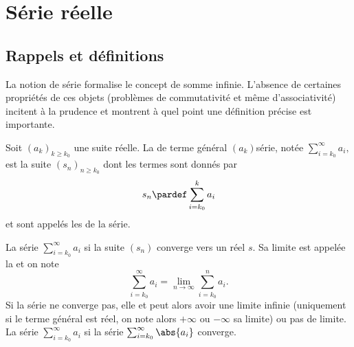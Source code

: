 
\section{Série réelle}
\label{secseries}

\subsection{Rappels et définitions}

La notion de série formalise le concept de somme infinie. L'absence de certaines propriétés de ces objets (problèmes de commutativité et même d'associativité) incitent à la prudence et montrent à quel point une définition précise est importante.

Soit ${(a_k)}_{k \geq k_0}$ une suite réelle. La  de terme général $(a_k)${série}, notée
\begin{math}
  \sum_{i=k_0}^\infty a_i,
\end{math}
est la suite ${(s_n)}_{n \geq k_0}$ dont les termes sont donnés par
\begin{equation*}
  s_n \pardef \sum_{i=k_0}^k a_i
\end{equation*}
et sont appelés les  de la série.

La série $\sum_{i=k_0}^\infty a_i$  si la suite $(s_n)$
converge vers un réel $s$. Sa limite est appelée la  et on note
\begin{equation}        \label{EqDefSommeLim}
  \sum_{i=k_0}^\infty a_i = \lim_{n\to\infty}\sum_{i=k_0}^na_i.
\end{equation}
Si la série ne converge pas, elle  et peut alors avoir
une limite infinie (uniquement si le terme général est réel, on note
alors $+\infty$ ou $-\infty$ sa limite) ou pas de limite.  La série
$\sum_{i=k_0}^\infty a_i$  si la série
$\sum_{i=k_0}^\infty \abs{a_i}$ converge.

